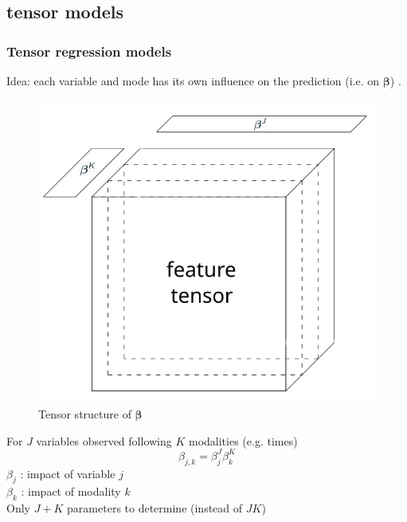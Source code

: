 \documentclass{beamer}
\begin{document}
\subsection{tensor models}
\begin{frame}
    \frametitle{Tensor regression models}
    Idea: each variable and mode has its own influence on the prediction (i.e. on $\bm{\beta}$) \cite{multi_rank_1}.\\[10 pt]
    \begin{overprint}
    \begin{figure}
        \centering
        \includegraphics[scale = 0.3]{images/beta_tens.png}
        \caption{Tensor structure of $\bm{\beta}$}
    \end{figure}
    \vspace{10 pt}
    For $J$ variables observed following $K$ modalities (e.g. times)
    $$\beta_{j,k} = \beta_j^J\beta_{k}^{K}$$
    $\beta_j$ : impact of variable $j$\\[5 pt]
    $\beta_k$ : impact of modality $k$\\[10 pt]
    Only $J+K$ parameters to determine (instead of $JK$)
    
\end{overprint}
\end{frame}
\end{document}
